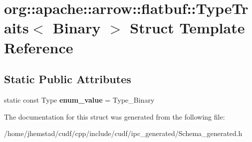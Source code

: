 \hypertarget{structorg_1_1apache_1_1arrow_1_1flatbuf_1_1TypeTraits_3_01Binary_01_4}{}\section{org\+:\+:apache\+:\+:arrow\+:\+:flatbuf\+:\+:Type\+Traits$<$ Binary $>$ Struct Template Reference}
\label{structorg_1_1apache_1_1arrow_1_1flatbuf_1_1TypeTraits_3_01Binary_01_4}
\subsection*{Static Public Attributes}
\begin{DoxyCompactItemize}
\item 
static const Type {\bfseries enum\+\_\+value} = Type\+\_\+\+Binary\hypertarget{structorg_1_1apache_1_1arrow_1_1flatbuf_1_1TypeTraits_3_01Binary_01_4_aef2d8b365b5be0e8e95ecc50c7811cd6}{}\label{structorg_1_1apache_1_1arrow_1_1flatbuf_1_1TypeTraits_3_01Binary_01_4_aef2d8b365b5be0e8e95ecc50c7811cd6}

\end{DoxyCompactItemize}


The documentation for this struct was generated from the following file\+:\begin{DoxyCompactItemize}
\item 
/home/jhemstad/cudf/cpp/include/cudf/ipc\+\_\+generated/Schema\+\_\+generated.\+h\end{DoxyCompactItemize}
